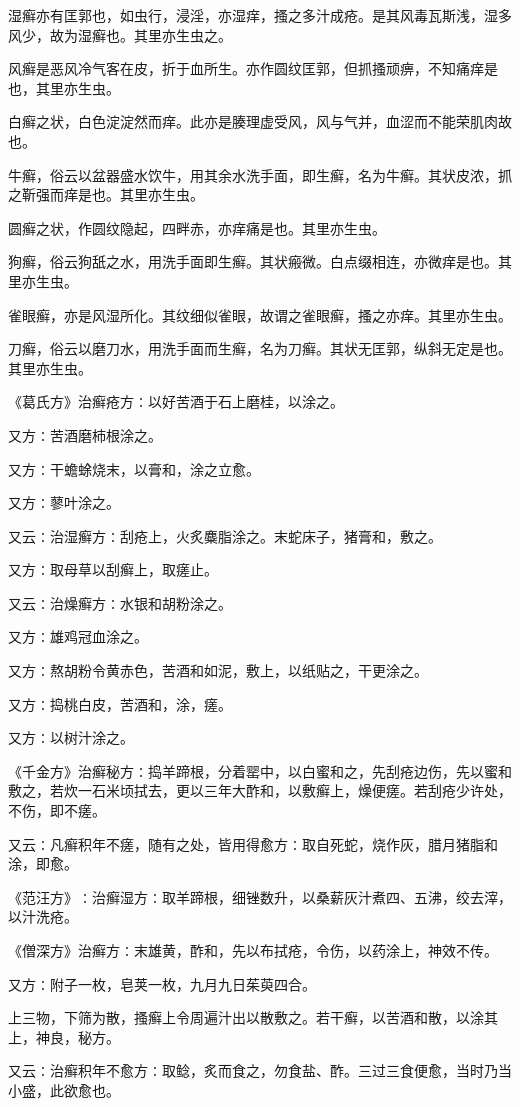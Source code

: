 \documentclass[a4paper,12pt,UTF8,twoside]{ctexbook}
\begin{document}
湿癣亦有匡郭也，如虫行，浸淫，亦湿痒，搔之多汁成疮。是其风毒瓦斯浅，湿多风少，故为湿癣也。其里亦生虫之。

风癣是恶风冷气客在皮，折于血所生。亦作圆纹匡郭，但抓搔顽痹，不知痛痒是也，其里亦生虫。

白癣之状，白色淀淀然而痒。此亦是腠理虚受风，风与气并，血涩而不能荣肌肉故也。

牛癣，俗云以盆器盛水饮牛，用其余水洗手面，即生癣，名为牛癣。其状皮浓，抓之靳强而痒是也。其里亦生虫。

圆癣之状，作圆纹隐起，四畔赤，亦痒痛是也。其里亦生虫。

狗癣，俗云狗舐之水，用洗手面即生癣。其状瘢微。白点缀相连，亦微痒是也。其里亦生虫。

雀眼癣，亦是风湿所化。其纹细似雀眼，故谓之雀眼癣，搔之亦痒。其里亦生虫。

刀癣，俗云以磨刀水，用洗手面而生癣，名为刀癣。其状无匡郭，纵斜无定是也。其里亦生虫。

《葛氏方》治癣疮方∶以好苦酒于石上磨桂，以涂之。

又方∶苦酒磨柿根涂之。

又方∶干蟾蜍烧末，以膏和，涂之立愈。

又方∶蓼叶涂之。

又云∶治湿癣方∶刮疮上，火炙麋脂涂之。末蛇床子，猪膏和，敷之。

又方∶取母草以刮癣上，取瘥止。

又云∶治燥癣方∶水银和胡粉涂之。

又方∶雄鸡冠血涂之。

又方∶熬胡粉令黄赤色，苦酒和如泥，敷上，以纸贴之，干更涂之。

又方∶捣桃白皮，苦酒和，涂，瘥。

又方∶以树汁涂之。

《千金方》治癣秘方∶捣羊蹄根，分着罂中，以白蜜和之，先刮疮边伤，先以蜜和敷之，若炊一石米顷拭去，更以三年大酢和，以敷癣上，燥便瘥。若刮疮少许处，不伤，即不瘥。

又云∶凡癣积年不瘥，随有之处，皆用得愈方∶取自死蛇，烧作灰，腊月猪脂和涂，即愈。

《范汪方》∶治癣湿方∶取羊蹄根，细锉数升，以桑薪灰汁煮四、五沸，绞去滓，以汁洗疮。

《僧深方》治癣方∶末雄黄，酢和，先以布拭疮，令伤，以药涂上，神效不传。

又方∶附子一枚，皂荚一枚，九月九日茱萸四合。

上三物，下筛为散，搔癣上令周遍汁出以散敷之。若干癣，以苦酒和散，以涂其上，神良，秘方。

又云∶治癣积年不愈方∶取鲶，炙而食之，勿食盐、酢。三过三食便愈，当时乃当小盛，此欲愈也。
\end{document}
